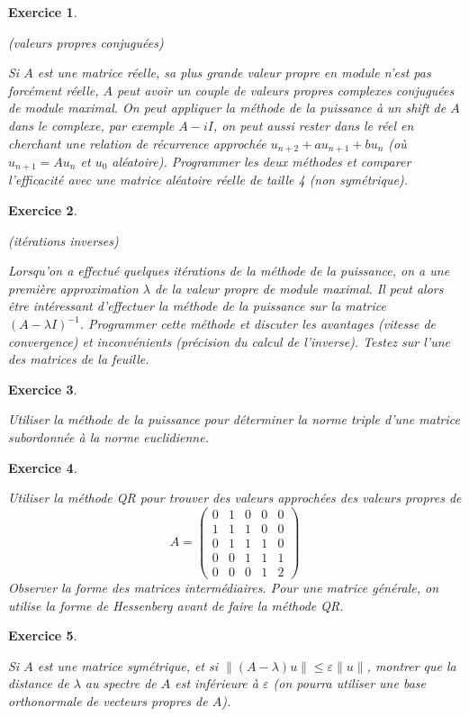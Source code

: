 \documentclass[10pt,a4paper]{article}
\newtheorem{exer}{Exercice}
\def\bexer{\begin{exer}\begin{em}}\def\eexer{\end{em}\end{exer}}
\def\1{{\rm 1\kern-.8ex 1}}
\begin{document}
\bexer (valeurs propres conjuguées)

Si $A$ est une matrice réelle, sa plus grande valeur propre en module n'est
pas forcément réelle, $A$ peut avoir un couple de valeurs propres
complexes conjuguées de module maximal. On peut appliquer la
méthode de la puissance à un shift de $A$ dans le complexe, par
exemple $A-iI$, on peut aussi rester dans le réel en cherchant
une relation de récurrence approchée $u_{n+2}+au_{n+1}+bu_n$
(où $u_{n+1}=Au_n$ et $u_0$ aléatoire). Programmer les deux
méthodes et comparer l'efficacité avec une matrice aléatoire
réelle de taille 4 (non symétrique).

\eexer

\bexer
(itérations inverses)

Lorsqu'on a effectué quelques itérations de la méthode de la puissance,
on a une première approximation $\lambda$ 
de la valeur propre de module maximal.
Il peut alors être intéressant d'effectuer la méthode de la puissance
sur la matrice $(A-\lambda I)^{-1}$. Programmer cette méthode
et discuter les avantages (vitesse de convergence) et inconvénients
(précision du calcul de l'inverse). Testez sur l'une des matrices
de la feuille.

\eexer


\bexer

Utiliser la m\'ethode de la puissance pour d\'eterminer la norme
triple d'une matrice subordonn\'ee \`a la norme euclidienne.
\eexer



\bexer
Utiliser la méthode QR pour trouver des valeurs approchées 
des valeurs propres de 
 \[A=\left(\begin{array}{ccccc}
0&1&0&0&0\\1&1&1&0&0\\0&1&1&1&0\\0&0&1&1&1\\0&0&0&1&2
\end{array}\right)\]
Observer la forme des matrices intermédiaires.
Pour une matrice g\'en\'erale, on utilise la forme de Hessenberg avant
de faire la m\'ethode QR.
\eexer

\bexer
Si $A$ est une matrice sym\'etrique, et si $\|(A-\lambda) u\| \leq
\varepsilon \| u\|$, montrer que la distance de $\lambda$ au spectre
de $A$ est inf\'erieure \`a $\varepsilon$ (on pourra utiliser une base
orthonormale de vecteurs propres de $A$).
\eexer
\end{document}
